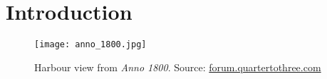\section{Introduction}


\begin{figure}[ht]
    \centering
    \texttt{[image: anno\_1800.jpg]}
    \caption{Harbour view from \textit{Anno 1800}. Source:
    \href{https://forum.quartertothree.com/t/anno-1800-city-building-in-the-industrial-revolution/131265/12}{\url{forum.quartertothree.com}}}\label{fig:anno}
\end{figure}
